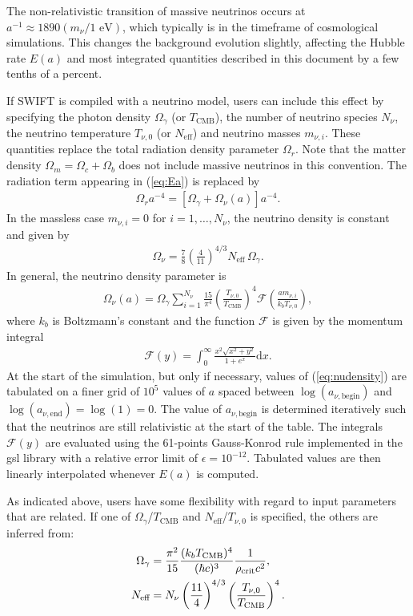 The non-relativistic transition of massive neutrinos occurs at
$a^{-1}\approx 1890 (m_\nu/1\text{ eV})$, which typically is in the timeframe of
cosmological simulations. This changes the background evolution slightly,
affecting the Hubble rate $E(a)$ and most integrated quantities described in this
document by a few tenths of a percent.

If SWIFT is compiled with a neutrino model, users can include this effect by
specifying the photon density $\Omega_\gamma$ (or $T_\text{CMB}$), the number of
neutrino species $N_\nu$, the neutrino temperature $T_{\nu,0}$ (or $N_\text{eff}$)
and neutrino masses $m_{\nu,i}$. These quantities replace the total radiation
density parameter $\Omega_r$. Note that the matter density $\Omega_m=\Omega_c+\Omega_b$
does not include massive neutrinos in this convention. The radiation term appearing in
(\ref{eq:Ea}) is replaced by
\begin{align}
    \Omega_r a^{-4} = \left[\Omega_\gamma + \Omega_\nu(a)\right] a^{-4}.
\end{align}
In the massless case $m_{\nu,i}=0$ for $i=1,\dots,N_\nu$, the neutrino density is constant and given by
\begin{align}
    \Omega_\nu = \frac{7}{8}\left(\frac{4}{11}\right)^{4/3} N_\text{eff}\,\Omega_\gamma.
\end{align}
In general, the neutrino density parameter is \citep{Zennaro2016}
\begin{align}
    \Omega_\nu(a) = \Omega_\gamma \sum_{i=1}^{N_\nu}\frac{15}{\pi^4}\left(\frac{T_{\nu,0}}{T_\text{CMB}}\right)^4 \mathcal{F}\left(\frac{a m_{\nu,i}}{k_b T_{\nu,0}}\right), \label{eq:nudensity}
\end{align}
where $k_b$ is Boltzmann's constant and the function $\mathcal{F}$ is given by the momentum integral
%
\begin{align}
    \mathcal{F}(y) = \int_0^{\infty} \frac{x^2\sqrt{x^2+y^2}}{1+e^{x}}\mathrm{d}x.
\end{align}
At the start of the simulation, but only if necessary, values of
(\ref{eq:nudensity}) are tabulated on a finer grid of $10^5$ values of $a$ spaced
between $\log(a_{\nu,\text{begin}})$ and $\log(a_{\nu,\text{end}}) = \log(1)=0$.
The value of $a_{\nu,\text{begin}}$ is determined iteratively such that the neutrinos
are still relativistic at the start of the table. The integrals $\mathcal{F}(y)$ are
evaluated using the 61-points Gauss-Konrod rule implemented in the {\sc gsl} library
with a relative error limit of $\epsilon=10^{-12}$. Tabulated values are then
linearly interpolated whenever $E(a)$ is computed.

As indicated above, users have some flexibility with regard to input parameters
that are related. If one of $\Omega_\gamma$/$T_\text{CMB}$ and $N_\text{eff}$/$T_{\nu,0}$
is specified, the others are inferred from:
%
\begin{align}
    \Omega_\gamma &= \frac{\pi^2}{15}\frac{(k_b T_\text{CMB})^4}{(\hbar c)^3}\frac{1}{\rho_{\rm crit}c^2},\\
    N_\text{eff} &= N_\nu\left(\frac{11}{4}\right)^{4/3}\left(\frac{T_{\nu,0}}{T_\text{CMB}}\right)^4.
\end{align}
